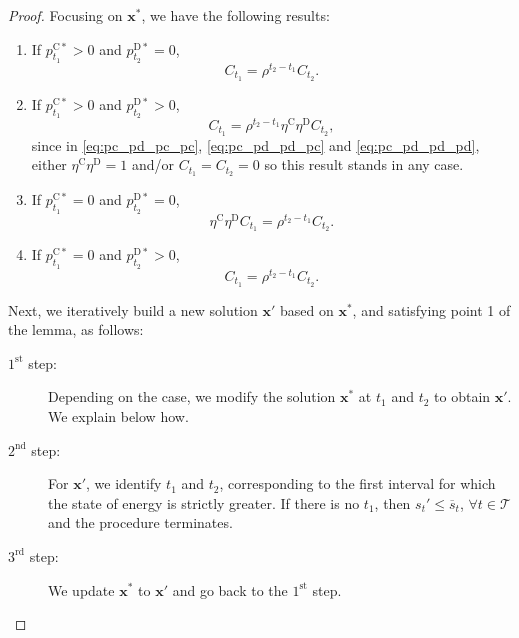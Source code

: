 \documentclass[10pt,a4paper]{amsart}
\newcommand{\up}[1]{^{\mathrm{#1}}}
\begin{document}
\begin{proof}
    Focusing on $\mathbf{x}^*$, we have the following results:
    \begin{enumerate}
        \item If $p_{t_1}\up{C*}>0$ and $p_{t_2}\up{D*}=0$,
        \begin{equation} \label{eq:pc_pc}
            C_{t_1} = \rho^{t_2 - t_1} C_{t_2}.
        \end{equation}
        \item If $p_{t_1}\up{C*}>0$ and $p_{t_2}\up{D*}>0$, 
        \begin{equation} \label{eq:pc_pd}
            C_{t_1} = \rho^{t_2 - t_1} \eta\up{C} \eta\up{D} C_{t_2},
        \end{equation}
        since in \eqref{eq:pc_pd_pc_pc}, \eqref{eq:pc_pd_pd_pc} and \eqref{eq:pc_pd_pd_pd}, either $\eta\up{C} \eta\up{D} = 1$ and/or $C_{t_1} = C_{t_2} = 0$ so this result stands in any case.
        \item If $p_{t_1}\up{C*}=0$ and $p_{t_2}\up{D*}=0$,
        \begin{equation} \label{eq:pd_pc}
           \eta\up{C} \eta\up{D} C_{t_1} =  \rho^{t_2 - t_1} C_{t_2}.
        \end{equation}
        \item If $p_{t_1}\up{C*}=0$ and $p_{t_2}\up{D*}>0$,
        \begin{equation} \label{eq:pd_pd}
           C_{t_1} = \rho^{t_2 - t_1} C_{t_2}.
        \end{equation}
    \end{enumerate}

    Next, we iteratively build a new solution $\mathbf{x}'$ based on $\mathbf{x}^*$, and satisfying point 1 of the lemma, as follows:
    \begin{description}
        \item[$1\up{st}$ step:] Depending on the case, we modify the solution $\mathbf{x}^*$ at $t_1$ and $t_2$ to obtain $\mathbf{x}'$. We explain below how.
        \item[$2\up{nd}$ step:] For $\mathbf{x}'$, we identify $t_1$ and $t_2$, corresponding to the first interval for which the state of energy is strictly greater. If there is no $t_1$, then $s_t' \leq \overline{s}_t$, $\forall t \in \mathcal{T}$ and the procedure terminates.
        \item[$3\up{rd}$ step:] We update $\mathbf{x}^*$ to $\mathbf{x}'$ and go back to the $1\up{st}$ step.
    \end{description}


\end{proof}
\end{document}

